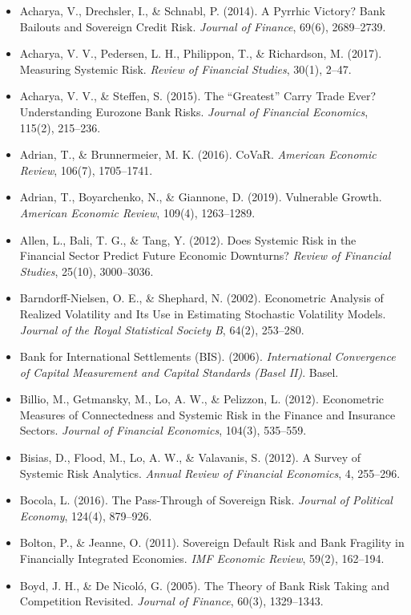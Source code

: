 \documentclass[5p,times,twocolumn,authoryear]{elsarticle}
\begin{document}
\begin{itemize}
    \item Acharya, V., Drechsler, I., \& Schnabl, P. (2014). A Pyrrhic Victory? Bank Bailouts and Sovereign Credit Risk. \textit{Journal of Finance}, 69(6), 2689–2739.
    \item Acharya, V. V., Pedersen, L. H., Philippon, T., \& Richardson, M. (2017). Measuring Systemic Risk. \textit{Review of Financial Studies}, 30(1), 2–47.
    \item Acharya, V. V., \& Steffen, S. (2015). The ``Greatest'' Carry Trade Ever? Understanding Eurozone Bank Risks. \textit{Journal of Financial Economics}, 115(2), 215–236.
    \item Adrian, T., \& Brunnermeier, M. K. (2016). CoVaR. \textit{American Economic Review}, 106(7), 1705–1741.
    \item Adrian, T., Boyarchenko, N., \& Giannone, D. (2019). Vulnerable Growth. \textit{American Economic Review}, 109(4), 1263–1289.
    \item Allen, L., Bali, T. G., \& Tang, Y. (2012). Does Systemic Risk in the Financial Sector Predict Future Economic Downturns? \textit{Review of Financial Studies}, 25(10), 3000–3036.
    \item Barndorff-Nielsen, O. E., \& Shephard, N. (2002). Econometric Analysis of Realized Volatility and Its Use in Estimating Stochastic Volatility Models. \textit{Journal of the Royal Statistical Society B}, 64(2), 253–280.
    \item Bank for International Settlements (BIS). (2006). \textit{International Convergence of Capital Measurement and Capital Standards (Basel II)}. Basel.
    \item Billio, M., Getmansky, M., Lo, A. W., \& Pelizzon, L. (2012). Econometric Measures of Connectedness and Systemic Risk in the Finance and Insurance Sectors. \textit{Journal of Financial Economics}, 104(3), 535–559.
    \item Bisias, D., Flood, M., Lo, A. W., \& Valavanis, S. (2012). A Survey of Systemic Risk Analytics. \textit{Annual Review of Financial Economics}, 4, 255–296.
    \item Bocola, L. (2016). The Pass-Through of Sovereign Risk. \textit{Journal of Political Economy}, 124(4), 879–926.
    \item Bolton, P., \& Jeanne, O. (2011). Sovereign Default Risk and Bank Fragility in Financially Integrated Economies. \textit{IMF Economic Review}, 59(2), 162–194.
    \item Boyd, J. H., \& De Nicoló, G. (2005). The Theory of Bank Risk Taking and Competition Revisited. \textit{Journal of Finance}, 60(3), 1329–1343.

\end{itemize}
\end{document}
